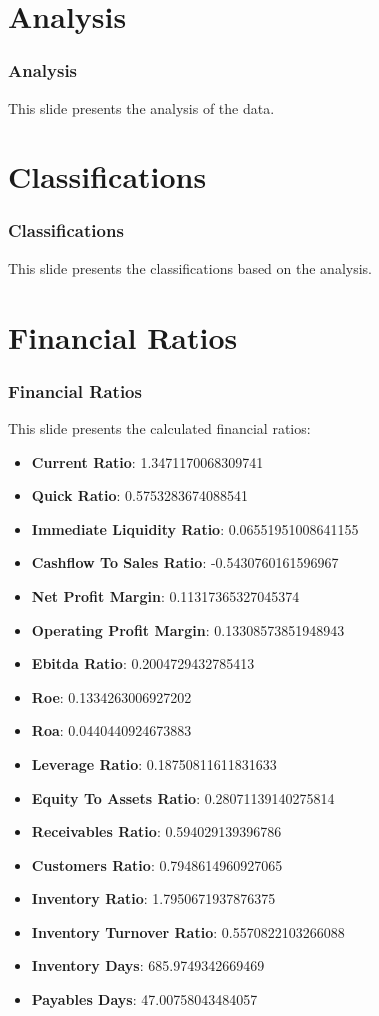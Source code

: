 \documentclass{beamer}%
\begin{document}
%
\section{Analysis}%
\label{sec:Analysis}%
\begin{frame}%
\frametitle{Analysis}%
This slide presents the analysis of the data.%
\end{frame}

%
\section{Classifications}%
\label{sec:Classifications}%
\begin{frame}%
\frametitle{Classifications}%
This slide presents the classifications based on the analysis.%
\end{frame}

%
\section{Financial Ratios}%
\label{sec:FinancialRatios}%
\begin{frame}%
\frametitle{Financial Ratios}%
This slide presents the calculated financial ratios:%
\begin{itemize}%
\item \textbf{Current Ratio}: 1.3471170068309741%
\item \textbf{Quick Ratio}: 0.5753283674088541%
\item \textbf{Immediate Liquidity Ratio}: 0.06551951008641155%
\item \textbf{Cashflow To Sales Ratio}: -0.5430760161596967%
\item \textbf{Net Profit Margin}: 0.11317365327045374%
\item \textbf{Operating Profit Margin}: 0.13308573851948943%
\item \textbf{Ebitda Ratio}: 0.2004729432785413%
\item \textbf{Roe}: 0.1334263006927202%
\item \textbf{Roa}: 0.0440440924673883%
\item \textbf{Leverage Ratio}: 0.18750811611831633%
\item \textbf{Equity To Assets Ratio}: 0.28071139140275814%
\item \textbf{Receivables Ratio}: 0.594029139396786%
\item \textbf{Customers Ratio}: 0.7948614960927065%
\item \textbf{Inventory Ratio}: 1.7950671937876375%
\item \textbf{Inventory Turnover Ratio}: 0.5570822103266088%
\item \textbf{Inventory Days}: 685.9749342669469%
\item \textbf{Payables Days}: 47.00758043484057%
\end{itemize}%
\end{frame}
\end{document}
